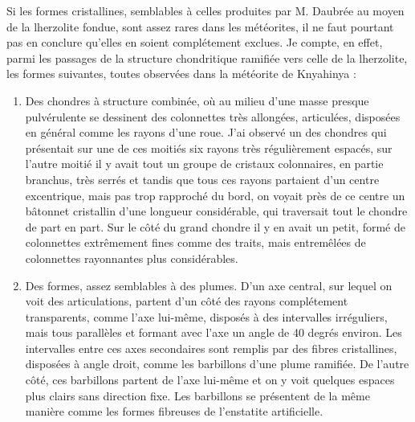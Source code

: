 \documentclass[a4paper, 12pt, oneside, french]{book}
\begin{document}
Si les formes cristallines, semblables à celles produites par M. Daubrée au moyen de la lherzolite fondue, sont assez rares dans les météorites, il ne faut pourtant pas en conclure qu'elles en soient complétement exclues. Je compte, en effet, parmi les passages de la structure chondritique ramifiée vers celle de la lherzolite, les formes suivantes, toutes observées dans la météorite de Knyahinya :
\begin{enumerate}
\item Des chondres à structure combinée, où au milieu d'une masse presque pulvérulente se dessinent des colonnettes très allongées, articulées, disposées en général comme les rayons d'une roue. J'ai observé un des chondres qui présentait sur une de ces moitiés six rayons très régulièrement espacés, sur l'autre moitié il y avait tout un groupe de cristaux colonnaires, en partie branchus, très serrés et tandis que tous ces rayons partaient d'un centre excentrique, mais pas trop rapproché du bord, on voyait près de ce centre un bâtonnet cristallin d'une longueur considérable, qui traversait tout le chondre de part en part. Sur le côté du grand chondre il y en avait un petit, formé de colonnettes extrêmement fines comme des traits, mais entremêlées de colonnettes rayonnantes plus considérables.
\item Des formes, assez semblables à des plumes. D'un axe central, sur lequel on voit des articulations, partent d'un côté des rayons complétement transparents, comme l'axe lui-même, disposés à des intervalles irréguliers, mais tous parallèles et formant avec l'axe un angle de 40 degrés environ. Les intervalles entre ces axes secondaires sont remplis par des fibres cristallines, disposées à angle droit, comme les barbillons d'une plume ramifiée. De l'autre côté, ces barbillons partent de l'axe lui-même et on y voit quelques espaces plus clairs sans direction fixe. Les barbillons se présentent de la même manière comme les formes fibreuses de l'enstatite artificielle.

\end{enumerate}
\end{document}
